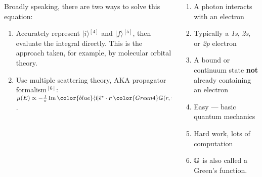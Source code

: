\begin{frame}[label=fgr]
\begin{columns}
\begin{column}{0.75\linewidth}
      Broadly speaking, there are two ways to solve this equation:
      \begin{enumerate}
      \item Accurately represent {\color{blue}$|i\rangle$}$^\mathrm{[4]}$  and
        {\color{Red4}$|f\rangle$}$^\mathrm{[5]}$, then evaluate
        the integral directly. This is the approach taken, for example, by
        molecular orbital theory.
      \item Use multiple scattering theory, AKA 
        propagator formalism$^\mathrm{[6]}$:\\
        {\footnotesize
        $\mu(E) \propto
        -\frac{1}{\pi} \Im {\color{blue}\langle \mathrm{i}
          |} \hat{\epsilon}^\ast \cdot \boldsymbol{r} \,
        {\color{Green4}\mathbb{G}(r,r';E)} \hat{\epsilon} \cdot \boldsymbol{r}' {\color{blue}|
          \mathrm{i} \rangle}
        \Theta(E-E_F)$.}
      \end{enumerate}      
    \end{column}
    \begin{column}{0.25\linewidth}
      \begin{enumerate}[1.]
        \scriptsize
      \item A photon interacts with an electron
      \item Typically a \textit{1s}, \textit{2s}, or \textit{2p} electron
      \item A bound or continuum state \textbf{not} already containing
        an electron
      \item Easy --- basic quantum mechanics
      \item Hard work, lots of computation
      \item {\color{Green4}$\mathbb{G}$} is also called a Green's function.
      \end{enumerate}
    \end{column}
  \end{columns}
\end{frame}

